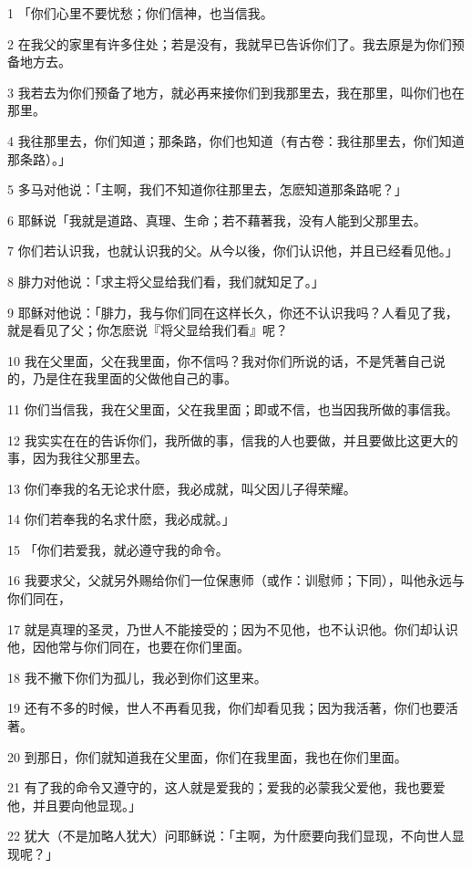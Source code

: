 \par 1 「你们心里不要忧愁；你们信神，也当信我。
\par 2 在我父的家里有许多住处；若是没有，我就早已告诉你们了。我去原是为你们预备地方去。
\par 3 我若去为你们预备了地方，就必再来接你们到我那里去，我在那里，叫你们也在那里。
\par 4 我往那里去，你们知道；那条路，你们也知道（有古卷：我往那里去，你们知道那条路）。」
\par 5 多马对他说：「主啊，我们不知道你往那里去，怎麽知道那条路呢？」
\par 6 耶稣说「我就是道路、真理、生命；若不藉著我，没有人能到父那里去。
\par 7 你们若认识我，也就认识我的父。从今以後，你们认识他，并且已经看见他。」
\par 8 腓力对他说：「求主将父显给我们看，我们就知足了。」
\par 9 耶稣对他说：「腓力，我与你们同在这样长久，你还不认识我吗？人看见了我，就是看见了父；你怎麽说『将父显给我们看』呢？
\par 10 我在父里面，父在我里面，你不信吗？我对你们所说的话，不是凭著自己说的，乃是住在我里面的父做他自己的事。
\par 11 你们当信我，我在父里面，父在我里面；即或不信，也当因我所做的事信我。
\par 12 我实实在在的告诉你们，我所做的事，信我的人也要做，并且要做比这更大的事，因为我往父那里去。
\par 13 你们奉我的名无论求什麽，我必成就，叫父因儿子得荣耀。
\par 14 你们若奉我的名求什麽，我必成就。」
\par 15 「你们若爱我，就必遵守我的命令。
\par 16 我要求父，父就另外赐给你们一位保惠师（或作：训慰师；下同），叫他永远与你们同在，
\par 17 就是真理的圣灵，乃世人不能接受的；因为不见他，也不认识他。你们却认识他，因他常与你们同在，也要在你们里面。
\par 18 我不撇下你们为孤儿，我必到你们这里来。
\par 19 还有不多的时候，世人不再看见我，你们却看见我；因为我活著，你们也要活著。
\par 20 到那日，你们就知道我在父里面，你们在我里面，我也在你们里面。
\par 21 有了我的命令又遵守的，这人就是爱我的；爱我的必蒙我父爱他，我也要爱他，并且要向他显现。」
\par 22 犹大（不是加略人犹大）问耶稣说：「主啊，为什麽要向我们显现，不向世人显现呢？」
